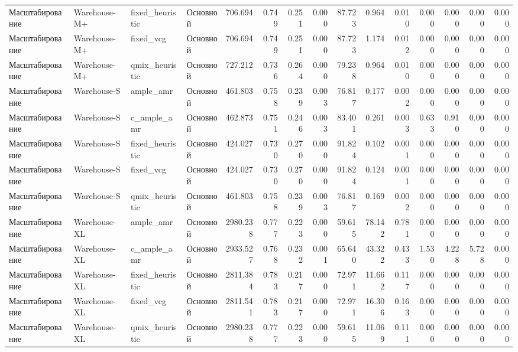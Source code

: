 \begin{tabular}{llllrrrrrrrrrrr}
 Масштабирование & Warehouse-M+ & fixed_heuristic & Основной & 706.694 & 0.749 & 0.251 & 0.000 & 87.723 & 0.964 & 0.010 & 0.000 & 0.000 & 0.000 & 0.000 \\
 Масштабирование & Warehouse-M+ & fixed_vcg & Основной & 706.694 & 0.749 & 0.251 & 0.000 & 87.723 & 1.174 & 0.012 & 0.000 & 0.000 & 0.000 & 0.000 \\
 Масштабирование & Warehouse-M+ & qmix_heuristic & Основной & 727.212 & 0.736 & 0.264 & 0.000 & 79.238 & 0.964 & 0.010 & 0.000 & 0.000 & 0.000 & 0.000 \\
 Масштабирование & Warehouse-S & ample_amr & Основной & 461.803 & 0.758 & 0.239 & 0.003 & 76.817 & 0.177 & 0.002 & 0.000 & 0.000 & 0.000 & 0.000 \\
 Масштабирование & Warehouse-S & c_ample_amr & Основной & 462.873 & 0.751 & 0.246 & 0.003 & 83.401 & 0.261 & 0.003 & 0.633 & 0.910 & 0.000 & 0.000 \\
 Масштабирование & Warehouse-S & fixed_heuristic & Основной & 424.027 & 0.730 & 0.270 & 0.000 & 91.824 & 0.102 & 0.001 & 0.000 & 0.000 & 0.000 & 0.000 \\
 Масштабирование & Warehouse-S & fixed_vcg & Основной & 424.027 & 0.730 & 0.270 & 0.000 & 91.824 & 0.124 & 0.001 & 0.000 & 0.000 & 0.000 & 0.000 \\
 Масштабирование & Warehouse-S & qmix_heuristic & Основной & 461.803 & 0.758 & 0.239 & 0.003 & 76.817 & 0.169 & 0.002 & 0.000 & 0.000 & 0.000 & 0.000 \\
 Масштабирование & Warehouse-XL & ample_amr & Основной & 2980.238 & 0.777 & 0.223 & 0.000 & 59.615 & 78.142 & 0.781 & 0.000 & 0.000 & 0.000 & 0.000 \\
 Масштабирование & Warehouse-XL & c_ample_amr & Основной & 2933.527 & 0.768 & 0.232 & 0.001 & 65.640 & 43.322 & 0.433 & 1.530 & 4.228 & 5.728 & 0.000 \\
 Масштабирование & Warehouse-XL & fixed_heuristic & Основной & 2811.384 & 0.783 & 0.217 & 0.000 & 72.971 & 11.662 & 0.117 & 0.000 & 0.000 & 0.000 & 0.000 \\
 Масштабирование & Warehouse-XL & fixed_vcg & Основной & 2811.541 & 0.783 & 0.217 & 0.000 & 72.971 & 16.306 & 0.163 & 0.000 & 0.000 & 0.000 & 0.000 \\
 Масштабирование & Warehouse-XL & qmix_heuristic & Основной & 2980.238 & 0.777 & 0.223 & 0.000 & 59.615 & 11.069 & 0.111 & 0.000 & 0.000 & 0.000 & 0.000 \\
\bottomrule
\end{tabular}
